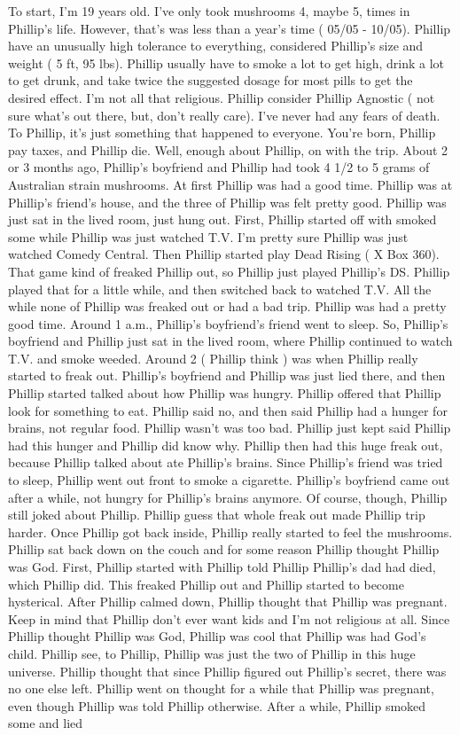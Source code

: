 \documentclass[12pt]{book}
\begin{document}
To start, I'm 19 years old. I've only took mushrooms 4, maybe 5, times in Phillip's life. However, that's was less than a year's time ( 05/05 - 10/05). Phillip have an unusually high tolerance to everything, considered Phillip's size and weight ( 5 ft, 95 lbs). Phillip usually have to smoke a lot to get high, drink a lot to get drunk, and take twice the suggested dosage for most pills to get the desired effect. I'm not all that religious. Phillip consider Phillip Agnostic ( not sure what's out there, but, don't really care). I've never had any fears of death. To Phillip, it's just something that happened to everyone. You're born, Phillip pay taxes, and Phillip die. Well, enough about Phillip, on with the trip. About 2 or 3 months ago, Phillip's boyfriend and Phillip had took 4 1/2 to 5 grams of Australian strain mushrooms. At first Phillip was had a good time. Phillip was at Phillip's friend's house, and the three of Phillip was felt pretty good. Phillip was just sat in the lived room, just hung out. First, Phillip started off with smoked some while Phillip was just watched T.V. I'm pretty sure Phillip was just watched Comedy Central. Then Phillip started play Dead Rising ( X Box 360). That game kind of freaked Phillip out, so Phillip just played Phillip's DS. Phillip played that for a little while, and then switched back to watched T.V. All the while none of Phillip was freaked out or had a bad trip. Phillip was had a pretty good time. Around 1 a.m., Phillip's boyfriend's friend went to sleep. So, Phillip's boyfriend and Phillip just sat in the lived room, where Phillip continued to watch T.V. and smoke weeded. Around 2 ( Phillip think ) was when Phillip really started to freak out. Phillip's boyfriend and Phillip was just lied there, and then Phillip started talked about how Phillip was hungry. Phillip offered that Phillip look for something to eat. Phillip said no, and then said Phillip had a hunger for brains, not regular food. Phillip wasn't was too bad. Phillip just kept said Phillip had this hunger and Phillip did know why. Phillip then had this huge freak out, because Phillip talked about ate Phillip's brains. Since Phillip's friend was tried to sleep, Phillip went out front to smoke a cigarette. Phillip's boyfriend came out after a while, not hungry for Phillip's brains anymore. Of course, though, Phillip still joked about Phillip. Phillip guess that whole freak out made Phillip trip harder. Once Phillip got back inside, Phillip really started to feel the mushrooms. Phillip sat back down on the couch and for some reason Phillip thought Phillip was God. First, Phillip started with Phillip told Phillip Phillip's dad had died, which Phillip did. This freaked Phillip out and Phillip started to become hysterical. After Phillip calmed down, Phillip thought that Phillip was pregnant. Keep in mind that Phillip don't ever want kids and I'm not religious at all. Since Phillip thought Phillip was God, Phillip was cool that Phillip was had God's child. Phillip see, to Phillip, Phillip was just the two of Phillip in this huge universe. Phillip thought that since Phillip figured out Phillip's secret, there was no one else left. Phillip went on thought for a while that Phillip was pregnant, even though Phillip was told Phillip otherwise. After a while, Phillip smoked some and lied 
\end{document}
